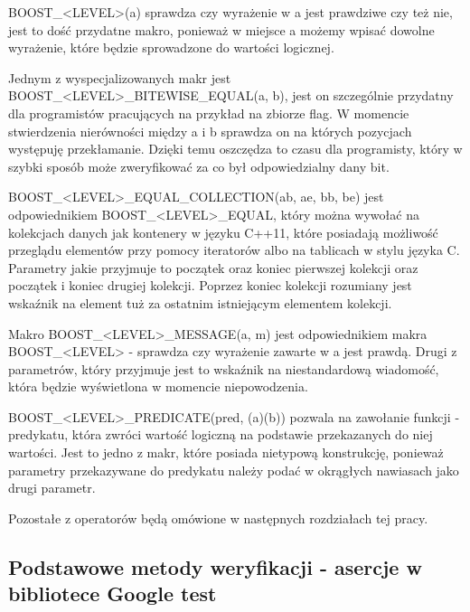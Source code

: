\documentclass[12pt,a4paper,notitlepage]{report}
\begin{document}
BOOST{\_}<LEVEL>(a) sprawdza czy wyrażenie w a jest prawdziwe czy też nie, jest to dość przydatne makro, ponieważ w miejsce a możemy wpisać dowolne wyrażenie, które będzie sprowadzone do wartości logicznej.

Jednym z wyspecjalizowanych makr jest BOOST{\_}<LEVEL>{\_}BITEWISE{\_}EQUAL(a, b), jest on szczególnie przydatny dla programistów pracujących na przykład na zbiorze flag. W momencie stwierdzenia nierówności między a i b sprawdza on na których pozycjach występuję przekłamanie. Dzięki temu oszczędza to czasu dla programisty, który w szybki sposób może zweryfikować za co był odpowiedzialny dany bit.

BOOST{\_}<LEVEL>{\_}EQUAL{\_}COLLECTION(ab, ae, bb, be) jest odpowiednikiem BOOST{\_}<LEVEL>{\_}EQUAL, który można wywołać na kolekcjach danych jak kontenery w języku C++11, które posiadają możliwość przeglądu elementów przy pomocy iteratorów albo na tablicach w stylu języka C. Parametry jakie przyjmuje to początek oraz koniec pierwszej kolekcji oraz początek i koniec drugiej kolekcji. Poprzez koniec kolekcji rozumiany jest wskaźnik na element tuż za ostatnim istniejącym elementem kolekcji.

Makro BOOST{\_}<LEVEL>{\_}MESSAGE(a, m) jest odpowiednikiem makra BOOST{\_}<LEVEL> - sprawdza czy wyrażenie zawarte w a jest prawdą. Drugi z parametrów, który przyjmuje jest to wskaźnik na niestandardową wiadomość, która będzie wyświetlona w momencie niepowodzenia.

BOOST{\_}<LEVEL>{\_}PREDICATE(pred, (a)(b)) pozwala na zawołanie funkcji - predykatu, która zwróci wartość logiczną na podstawie przekazanych do niej wartości. Jest to jedno z makr, które posiada nietypową konstrukcję, ponieważ parametry przekazywane do predykatu należy podać w okrągłych nawiasach jako drugi parametr.

Pozostałe z operatorów będą omówione w następnych rozdziałach tej pracy.

			

\subsection{Podstawowe metody weryfikacji - asercje w bibliotece Google test}
\end{document}

